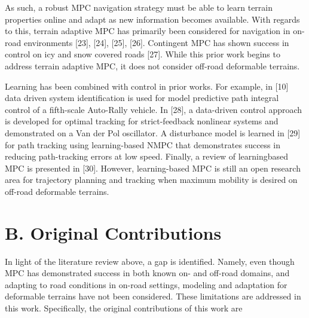 \documentclass[10pt]{article}
\begin{document}
As such, a robust MPC navigation strategy must be able to learn terrain properties online and adapt as new information becomes available. With regards to this, terrain adaptive MPC has primarily been considered for navigation in on-road environments [23], [24], [25], [26]. Contingent MPC has shown success in control on icy and snow covered roads [27]. While this prior work begins to address terrain adaptive MPC, it does not consider off-road deformable terrains.

Learning has been combined with control in prior works. For example, in [10] data driven system identification is used for model predictive path integral control of a fifth-scale Auto-Rally vehicle. In [28], a data-driven control approach is developed for optimal tracking for strict-feedback nonlinear systems and demonstrated on a Van der Pol oscillator. A disturbance model is learned in [29] for path tracking using learning-based NMPC that demonstrates success in reducing path-tracking errors at low speed. Finally, a review of learningbased MPC is presented in [30]. However, learning-based MPC is still an open research area for trajectory planning and tracking when maximum mobility is desired on off-road deformable terrains.

\section*{B. Original Contributions}
In light of the literature review above, a gap is identified. Namely, even though MPC has demonstrated success in both known on- and off-road domains, and adapting to road conditions in on-road settings, modeling and adaptation for deformable terrains have not been considered. These limitations are addressed in this work. Specifically, the original contributions of this work are
\end{document}
